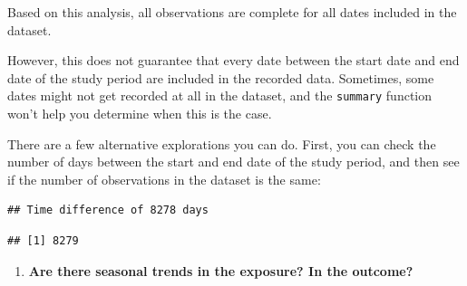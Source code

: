 \documentclass[
]{book}
\newenvironment{Shaded}{\begin{snugshade}}{\end{snugshade}}
\newcommand{\CommentTok}[1]{\textcolor[rgb]{0.56,0.35,0.01}{\textit{#1}}}
\newcommand{\KeywordTok}[1]{\textcolor[rgb]{0.13,0.29,0.53}{\textbf{#1}}}
\newcommand{\NormalTok}[1]{#1}
\newcommand{\OperatorTok}[1]{\textcolor[rgb]{0.81,0.36,0.00}{\textbf{#1}}}
\newcommand{\StringTok}[1]{\textcolor[rgb]{0.31,0.60,0.02}{#1}}
\providecommand{\tightlist}{%
  \setlength{\itemsep}{0pt}\setlength{\parskip}{0pt}}
\begin{document}
Based on this analysis, all observations are complete for all dates included
in the dataset.

However, this does not guarantee that every date between the start date and
end date of the study period are included in the recorded data. Sometimes,
some dates might not get recorded at all in the dataset, and the \texttt{summary}
function won't help you determine when this is the case.

There are a few alternative explorations you can do. First, you can check
the number of days between the start and end date of the study period, and
then see if the number of observations in the dataset is the same:

\begin{Shaded}
\end{Shaded}

\begin{verbatim}
## Time difference of 8278 days
\end{verbatim}

\begin{Shaded}
\end{Shaded}

\begin{verbatim}
## [1] 8279
\end{verbatim}

\begin{enumerate}
\def\labelenumi{\arabic{enumi}.}
\setcounter{enumi}{2}
\tightlist
\item
  \textbf{Are there seasonal trends in the exposure? In the outcome?}
\end{enumerate}
\end{document}
